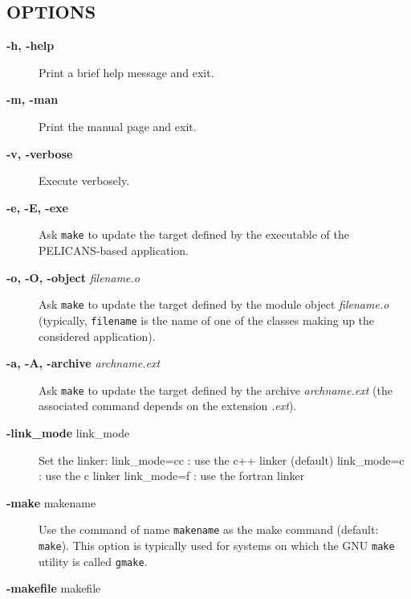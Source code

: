 \documentclass{article}
\begin{document}
\subsection*{OPTIONS\label{build_OPTIONS}}
\begin{description}

\item[\textbf{-h, -help}] \mbox{}

Print a brief help message and exit.


\item[\textbf{-m, -man}] \mbox{}

Print the manual page and exit.


\item[\textbf{-v, -verbose}] \mbox{}

Execute verbosely.


\item[\textbf{-e, -E, -exe}] \mbox{}

Ask \texttt{make} to
update the target defined by 
the executable of the PELICANS-based application.


\item[\textbf{-o, -O, -object} \emph{filename.o}] \mbox{}

Ask \texttt{make} to update the target
defined by the module object \emph{filename.o}
(typically, \texttt{filename} is the name of one of
the classes making up
the considered application).


\item[\textbf{-a, -A, -archive} \emph{archname.ext}] \mbox{}

Ask \texttt{make} to update the target
defined by the archive \emph{archname.ext}
(the associated command depends on
the extension \emph{.ext}).


\item[\textbf{-link\_mode} link\_mode] \mbox{}

Set the linker:
    link\_mode=cc : use the c++ linker (default)
    link\_mode=c  : use the c linker
    link\_mode=f  : use the fortran linker


\item[\textbf{-make} makename] \mbox{}

Use the command of name \texttt{makename} as 
the make command (default: \texttt{make}).
This option is typically used for systems
on which the GNU \texttt{make} utility is
called \texttt{gmake}.


\item[\textbf{-makefile} makefile] \mbox{}


\end{description}
\end{document}
